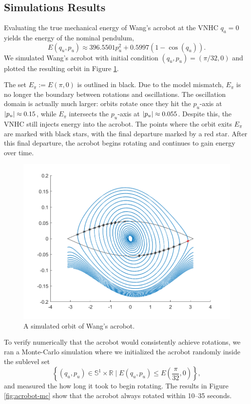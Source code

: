 \documentclass[journal,twoside,web]{ieeecolor}
\DeclarePairedDelimiter{\abs}{\lvert}{\rvert}
\newcommand*{\R}{\mathbb{R}}
\newcommand*{\Sone}{\mathbb{S}^1}
\newcommand*{\SxR}{\Sone \times \R}
\begin{document}
\subsection{Simulations Results}
Evaluating the true mechanical energy of Wang's acrobot at the VNHC
\(q_a = 0\) yields the energy of the nominal pendulum,
\[
    E(q_u,p_u) \approx 396.5501 p_u^2 + 0.5997(1 - \cos(q_u))
    .
\]
We simulated Wang's acrobot with initial condition
\((q_u,p_u) = \left(\pi/32,0 \right)\) and plotted the resulting orbit
in Figure \ref{fig:acrobot-orbit}.

The set \(E_\pi := E(\pi,0)\) is outlined in black. 
Due to the model mismatch, \(E_\pi\) is no longer the boundary between
rotations and oscillations.
The oscillation domain is actually much larger: orbits rotate once they hit the
\(p_u\)-axis at \(\abs{p_u} \approx 0.15\), while \(E_\pi\) intersects the
\(p_u\)-axis at \(\abs{p_u} \approx 0.055\).
Despite this, the VNHC still injects energy into the acrobot.
The points where the orbit exits \(E_\pi\) are marked with black stars,
with the final departure marked by a red star.
After this final departure, the acrobot begins rotating and continues to gain
energy over time.

\begin{figure}[]
    \centering
    \includegraphics[width=0.7\linewidth]{acrobot_orbit.png}
    \caption{A simulated orbit of Wang's acrobot.}
    \label{fig:acrobot-orbit}
\end{figure}
To verify numerically that the acrobot would consistently achieve rotations, we
ran a Monte-Carlo simulation \cite{montecarlo} where we initialized the acrobot
randomly inside the sublevel set
\[
    \left\{(q_u,p_u) \in \SxR \mid
    E(q_u,p_u) \leq E\left(\frac{\pi}{32},0\right)\right\}
    ,
\] 
and measured the how long it took to begin rotating.
The results in Figure \ref{fig:acrobot-mc} show that
the acrobot always rotated within 10--35 seconds.
\end{document}

